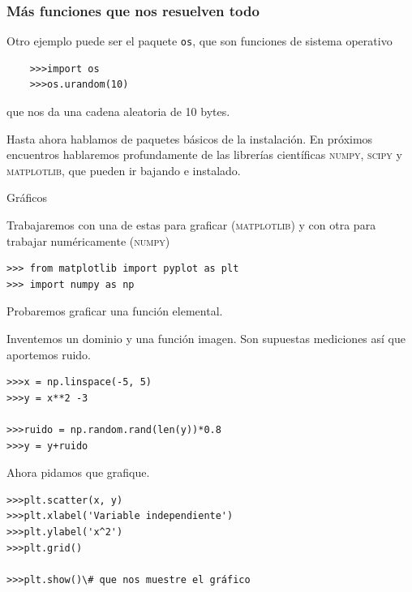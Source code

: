 \documentclass{beamer}
\begin{document}
\begin{frame}[fragile]
\frametitle{Más funciones que nos resuelven todo}
    Otro ejemplo puede ser el paquete \texttt{os}, que son funciones de sistema operativo
    \begin{verbatim}
    >>>import os
    >>>os.urandom(10)
    \end{verbatim}
    que nos da una cadena aleatoria de 10 bytes.

    Hasta ahora hablamos de paquetes básicos de la instalación. En próximos encuentros hablaremos profundamente de las librerías científicas \textsc{numpy}, \textsc{scipy} y \textsc{matplotlib}, que pueden ir bajando e instalado.
\end{frame}


\begin{frame}[fragile]{Gráficos}

Trabajaremos con una de estas para graficar (\textsc{matplotlib})
y con otra para trabajar numéricamente (\textsc{numpy})
\begin{verbatim}
>>> from matplotlib import pyplot as plt
>>> import numpy as np
\end{verbatim}

Probaremos graficar una función elemental.
\end{frame}

\begin{frame}[fragile]

Inventemos un dominio y una función imagen. Son supuestas mediciones así que aportemos ruido.

\begin{verbatim}
>>>x = np.linspace(-5, 5)
>>>y = x**2 -3

>>>ruido = np.random.rand(len(y))*0.8
>>>y = y+ruido
\end{verbatim}
\end{frame}

\begin{frame}[fragile]

Ahora pidamos que grafique.

\begin{verbatim}
>>>plt.scatter(x, y)
>>>plt.xlabel('Variable independiente')
>>>plt.ylabel('x^2')
>>>plt.grid()

>>>plt.show()\# que nos muestre el gráfico
\end{verbatim}
\end{frame}
\end{document}
